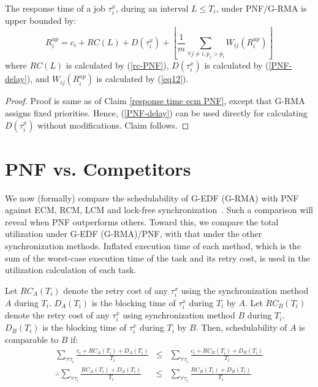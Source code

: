 \begin{clm}\label{response rcm PNF}
The response time of a job $\tau_{i}^{x}$, during an interval $L\le T_{i}$, under PNF/G-RMA is upper bounded by: 
\begin{equation}
R_{i}^{up}=c_{i}+RC(L)+D(\tau_{i}^{x})+\left\lfloor \frac{1}{m}\sum_{\forall j\ne i,p_j>p_i}W_{ij}(R_{i}^{up})\right\rfloor 
\end{equation}
where $RC(L)$ is calculated by (\ref{rc-PNF}), $D(\tau_{i}^{x})$
is calculated by (\ref{PNF-delay}), and $W_{ij}(R_{i}^{up})$
is calculated by (\ref{eq12}).
\end{clm}
\begin{proof}\normalfont
Proof is same as of Claim \ref{response time ecm PNF}, 
except that G-RMA assigns fixed priorities. Hence, (\ref{PNF-delay}) can be used directly for calculating $D(\tau_{i}^{x})$ without modifications. Claim follows.
\end{proof}


\section{PNF vs. Competitors}
\label{sec:pnf-sched-comparison}

We now (formally) compare the schedulability of G-EDF (G-RMA) with PNF against ECM, RCM, LCM and lock-free synchronization~\cite{stmconcurrencycontrol:emsoft11,lcmdac2012, key-5}. 
Such a comparison will reveal when PNF outperforms  others. 
Toward this, we compare the total utilization under G-EDF (G-RMA)/PNF,  with that under the other synchronization methods.
Inflated execution time of each method, which is the sum of the worst-case execution time of the task and its retry cost, is used in the utilization calculation of each task.
%

Let $RC_{A}(T_{i})$ denote the retry cost of any $\tau_i^x$ using the synchronization method $A$ during $T_i$. $D_A(T_i)$ is the blocking time of $\tau_i^x$ during $T_i$ by $A$. Let $RC_{B}(T_{i})$ denote the  retry cost of any $\tau_i^x$ using synchronization method $B$ during $T_i$. $D_B(T_i)$ is the blocking time of $\tau_i^x$ during $T_i$ by $B$. Then, schedulability of $A$ is comparable to $B$ if:
\begin{eqnarray}
\sum_{\forall\tau_{i}}\frac{c_{i}+RC_{A}(T_{i})+D_A(T_i)}{T_{i}} & \le & \sum_{\forall\tau_{i}}\frac{c_{i}+RC_{B}(T_{i})+D_B(T_i)}{T_{i}}\nonumber \\
\therefore\sum_{\forall\tau_{i}}\frac{RC_{A}(T_{i})+D_A(T_i)}{T_{i}} & \le & \sum_{\forall\tau_{i}}\frac{RC_{B}(T_{i})+D_B(T_i)}{T_{i}}\label{utilization comparison}
\end{eqnarray}


